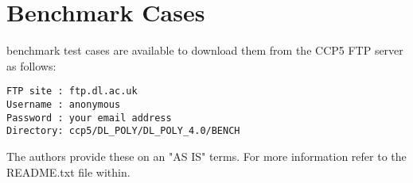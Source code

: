 \section{Benchmark Cases}

\D benchmark test cases are available to download them from the CCP5 FTP
server as follows:

\begin{lstlisting}
FTP site : ftp.dl.ac.uk
Username : anonymous
Password : your email address
Directory: ccp5/DL_POLY/DL_POLY_4.0/BENCH
\end{lstlisting}

The \D authors provide these on an "AS IS" terms.  For more information
refer to the README.txt file within.
